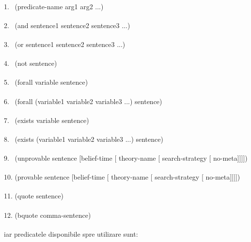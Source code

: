 \documentclass{article}
\begin{document}
{\footnotesize
\noindent \\
1. \ (predicate-name arg1 arg2 ...)
\\ \\
2.  \ (and sentence1 sentence2 sentence3 ...)
\\ \\
3.  \ (or sentence1 sentence2 sentence3 ...)
\\ \\
4.  \ (not sentence)
\\ \\
5.  \ (forall variable sentence)
\\ \\
6.  \ (forall (variable1 variable2 variable3 ...) sentence)
\\ \\
7.  \ (exists variable sentence)
\\ \\
8.  \ (exists (variable1 variable2 variable3 ...) sentence)
\\ \\
9.  \ (unprovable sentence [belief-time [ theory-name [ search-strategy [ no-meta]]]])
\\ \\
10. (provable sentence [belief-time [ theory-name [ search-strategy [ no-meta]]]])
\\ \\
11. (quote sentence)
\\ \\
12. (bquote comma-sentence)
}
\\ \\
iar predicatele disponibile spre utilizare sunt:
\\ \\
\end{document}
